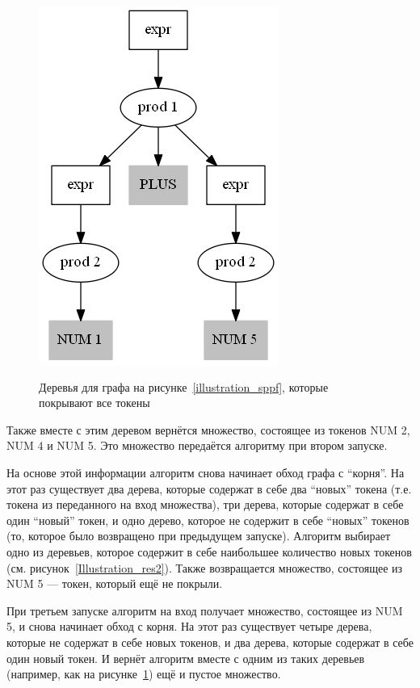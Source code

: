 \begin{figure}[t]
{        \centering
        \includegraphics{Ivanov/Pictures/Illustration_res3.png}
        \label{Illustration_res3}
    }
    \caption{Деревья для графа на рисунке~\ref{illustration_sppf}, которые покрывают все токены}
\end{figure}

Также вместе с этим деревом вернётся множество, состоящее из токенов NUM 2, NUM 4 и NUM 5. Это множество передаётся алгоритму при втором запуске. 

На основе этой информации алгоритм снова начинает обход графа с ``корня''. На этот раз существует два дерева, которые содержат в себе два ``новых'' токена (т.е. токена из переданного на вход множества), три дерева, которые содержат в себе один ``новый'' токен, и одно дерево, которое не содержит в себе ``новых'' токенов (то, которое было возвращено при предыдущем запуске). Алгоритм выбирает одно из деревьев, которое содержит в себе наибольшее количество новых токенов (см. рисунок~\ref{Illustration_res2}). Также возвращается множество, состоящее из NUM 5 --- токен, который ещё не покрыли. 

При третьем запуске алгоритм на вход получает множество, состоящее из NUM 5, и снова начинает обход с корня. На этот раз существует четыре дерева, которые не содержат в себе новых токенов, и два дерева, которые содержат в себе один новый токен. И вернёт алгоритм вместе с одним из таких деревьев (например, как на рисунке~\ref{Illustration_res3}) ещё и пустое множество. 

